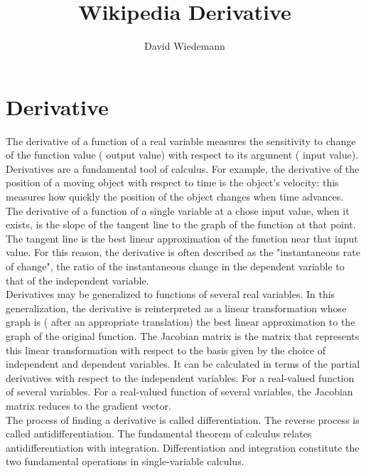 
\title{Wikipedia Derivative}
\author{David Wiedemann}
\date{}

\maketitle

\chapter{Derivative}
The derivative of a function of a real variable measures the sensitivity to change of the function value ( output
value) with respect to its argument ( input value). Derivatives are a fundamental tool of calculus. For example, the
derivative of the position of a moving object with respect to time is the object's velocity: this measures how
quickly the position of the object changes when time advances.\\
The derivative of a function of a single variable at a chose input value, when it exists, is the slope of the tangent
line to the graph of the function at that point. The tangent line is the best linear approximation of the function
near that input value. For this reason, the derivative is often described as the "instantaneous rate of change", the ratio of the instantaneous change in the dependent variable to that of the independent variable.\\

Derivatives may be generalized to functions of several real variables. In this generalization, the derivative is reinterpreted as a linear transformation whose graph is ( after an appropriate translation) the best linear approximation to the graph of the original function. The Jacobian matrix is the matrix that represents this linear transformation with respect to the basis given by the choice of independent and dependent variables. It can be calculated in terms of the partial derivatives with respect to the independent variables. For a real-valued function of several variables. For a real-valued function of several variables, the Jacobian matrix reduces to the gradient vector.\\

The process of finding a derivative is called differentiation. The reverse process is called antidifferentiation. The fundamental theorem of calculus relates antidifferentiation with integration. Differentiation and integration constitute the two fundamental operations in single-variable calculus.\\

